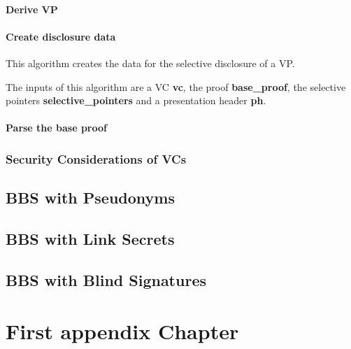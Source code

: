 \documentclass[
	a4paper               %
	,bibliography=totoc   %
	,listof=totoc         %
	,monolingual
	twoside=false,
]{bfhthesis}              %
\begin{document}
\subsubsection{Derive VP}
\label{subsub:derivevp}


\subsubsection{Create disclosure data}
\label{subsub:createdisclosuredata}

This algorithm creates the data for the selective disclosure of a VP.

The inputs of this algorithm are a VC \textbf{vc}, the proof \textbf{base\_proof}, the selective pointers \textbf{selective\_pointers} and a presentation header \textbf{ph}.

\subsubsection{Parse the base proof}
\label{subsub:parsebaseproof}




\subsection{Security Considerations of VCs}
\label{subsec:vcseccons}

\section{BBS with Pseudonyms}
\label{chap:Pseudonyms}

\section{BBS with Link Secrets}
\label{chap:linksecrets}

\section{BBS with Blind Signatures}
\label{chap:blindsignatures}




\appendix


\chapter{First appendix Chapter}





\end{document}
